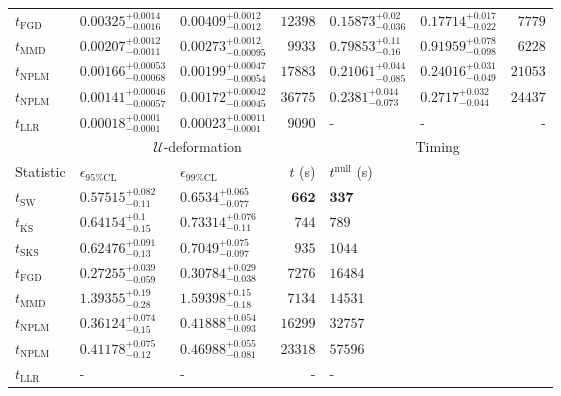 \begin{tabular}{l|llr|llr}
	$t_{\mathrm{FGD}}$ & $0.00325_{-0.0016}^{+0.0014}$ & $0.00409_{-0.0012}^{+0.0012}$ & $12398$ & ${\mathbf{0.15873_{-0.036}^{+0.02}}}$ & ${\mathbf{0.17714_{-0.022}^{+0.017}}}$ & $7779$ \\
	$t_{\mathrm{MMD}}$ & ${\mathbf{0.00207_{-0.0011}^{+0.0012}}}$ & ${\mathbf{0.00273_{-0.00095}^{+0.0012}}}$ & $9933$ & $0.79853_{-0.16}^{+0.11}$ & $0.91959_{-0.098}^{+0.078}$ & $6228$ \\
\rowcolor{red!35}	$t_{\mathrm{NPLM}}$ & $0.00166_{-0.00068}^{+0.00053}$ & $0.00199_{-0.00054}^{+0.00047}$ & $17883$ & $0.21061_{-0.085}^{+0.044}$ & $0.24016_{-0.049}^{+0.031}$ & $21053$ \\
\rowcolor{blue!35}	$t_{\mathrm{NPLM}}$ & $0.00141_{-0.00057}^{+0.00046}$ & $0.00172_{-0.00045}^{+0.00042}$ & $36775$ & $0.2381_{-0.073}^{+0.044}$ & $0.2717_{-0.044}^{+0.032}$ & $24437$ \\
	$t_{\mathrm{LLR}}$ & $0.00018_{-0.0001}^{+0.0001}$ & $0.00023_{-0.0001}^{+0.00011}$ & $9090$ & - & - & - \\
	\toprule
	\multicolumn{1}{c}{} & \multicolumn{3}{c}{$\mathcal{U}$-deformation} & \multicolumn{3}{c}{Timing} \\
	Statistic & $\epsilon_{95\%\mathrm{CL}}$ & $\epsilon_{99\%\mathrm{CL}}$ & $t$ (s) & $t^{\mathrm{null}}$ (s) \\
	\midrule
	$t_{\mathrm{SW}}$ & $0.57515_{-0.11}^{+0.082}$ & $0.6534_{-0.077}^{+0.065}$ & ${\mathbf{662}}$ & ${\mathbf{337}}$ \\
	$t_{\overline{\mathrm{KS}}}$ & $0.64154_{-0.15}^{+0.1}$ & $0.73314_{-0.11}^{+0.076}$ & $744$ & $789$ \\
	$t_{\mathrm{SKS}}$ & $0.62476_{-0.13}^{+0.091}$ & $0.7049_{-0.097}^{+0.075}$ & $935$ & $1044$ \\
	$t_{\mathrm{FGD}}$ & ${\mathbf{0.27255_{-0.059}^{+0.039}}}$ & ${\mathbf{0.30784_{-0.038}^{+0.029}}}$ & $7276$ & $16484$ \\
	$t_{\mathrm{MMD}}$ & $1.39355_{-0.28}^{+0.19}$ & $1.59398_{-0.18}^{+0.15}$ & $7134$ & $14531$ \\
\rowcolor{red!35}	$t_{\mathrm{NPLM}}$ & $0.36124_{-0.15}^{+0.074}$ & $0.41888_{-0.093}^{+0.054}$ & $16299$ & $32757$ \\
\rowcolor{blue!35}	$t_{\mathrm{NPLM}}$ & $0.41178_{-0.12}^{+0.075}$ & $0.46988_{-0.081}^{+0.055}$ & $23318$ & $57596$ \\
	$t_{\mathrm{LLR}}$ & - & - & - & - \\
	\bottomrule
\end{tabular}